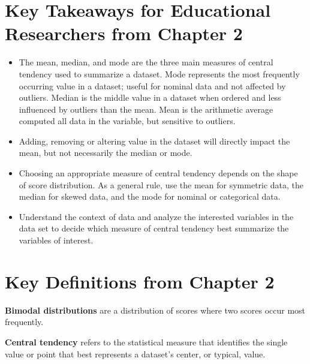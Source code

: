 \documentclass[
  letterpaper,
  DIV=11,
  numbers=noendperiod]{scrreprt}
\begin{document}
\section*{Key Takeaways for Educational Researchers from Chapter
2}\label{key-takeaways-for-educational-researchers-from-chapter-2-1}


\begin{itemize}
\item
  The mean, median, and mode are the three main measures of central
  tendency used to summarize a dataset. Mode represents the most
  frequently occurring value in a dataset; useful for nominal data and
  not affected by outliers. Median is the middle value in a dataset when
  ordered and less influenced by outliers than the mean. Mean is the
  arithmetic average computed all data in the variable, but sensitive to
  outliers.
\item
  Adding, removing or altering value in the dataset will directly impact
  the mean, but not necessarily the median or mode.
\item
  Choosing an appropriate measure of central tendency depends on the
  shape of score distribution. As a general rule, use the mean for
  symmetric data, the median for skewed data, and the mode for nominal
  or categorical data.
\item
  Understand the context of data and analyze the interested variables in
  the data set to decide which measure of central tendency best
  summarize the variables of interest.
\end{itemize}

\section*{Key Definitions from Chapter
2}\label{key-definitions-from-chapter-2-1}


\textbf{Bimodal distributions} are a distribution of scores where two
scores occur most frequently.

\textbf{Central tendency} refers to the statistical measure that
identifies the single value or point that best represents a dataset's
center, or typical, value.
\end{document}
